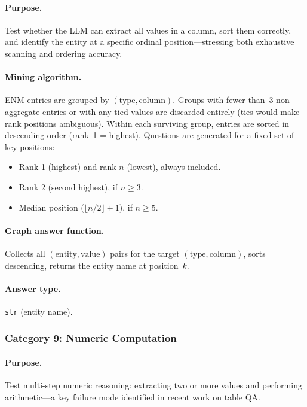 \documentclass[11pt]{article}
\begin{document}
\paragraph{Purpose.}  Test whether the LLM can extract all values in a
column, sort them correctly, and identify the entity at a specific ordinal
position---stressing both exhaustive scanning and ordering accuracy.

\paragraph{Mining algorithm.}
ENM entries are grouped by $(\text{type}, \text{column})$.  Groups with
fewer than~3 non-aggregate entries or with any tied values are discarded
entirely (ties would make rank positions ambiguous).  Within each
surviving group, entries are sorted in descending order (rank~1 =
highest).  Questions are generated for a fixed set of key positions:

\begin{itemize}[leftmargin=2em]
  \item Rank 1 (highest) and rank $n$ (lowest), always included.
  \item Rank 2 (second highest), if $n \geq 3$.
  \item Median position ($\lfloor n/2 \rfloor + 1$), if $n \geq 5$.
\end{itemize}

\paragraph{Graph answer function.}
Collects all $(\text{entity}, \text{value})$ pairs for the target
$(\text{type}, \text{column})$, sorts descending, returns the entity name
at position~$k$.

\paragraph{Answer type.} \texttt{str} (entity name).

\subsubsection{Category 9: Numeric Computation}

\paragraph{Purpose.}  Test multi-step numeric reasoning: extracting two or
more values and performing arithmetic---a key failure mode identified in
recent work on table QA.
\end{document}
